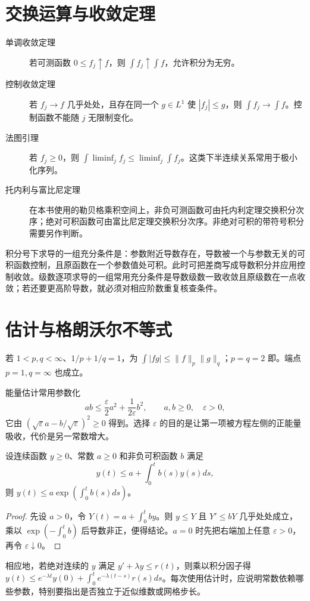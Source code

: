 \documentclass[UTF8,12pt,a4paper,fontset=fandol]{ctexbook}
\begin{document}
\section{交换运算与收敛定理}
\begin{description}
 \item[单调收敛定理] 若可测函数 $0\le f_j\uparrow f$，则 $\int f_j\uparrow\int f$，允许积分为无穷。
 \item[控制收敛定理] 若 $f_j\to f$ 几乎处处，且存在同一个 $g\in L^1$ 使 $|f_j|\le g$，则 $\int f_j\to\int f$。控制函数不能随 $j$ 无限制变化。
 \item[法图引理] 若 $f_j\ge0$，则 $\int\liminf_j f_j\le\liminf_j\int f_j$。这类下半连续关系常用于极小化序列。
 \item[托内利与富比尼定理] 在本书使用的勒贝格乘积空间上，非负可测函数可由托内利定理交换积分次序；绝对可积函数可由富比尼定理交换积分次序。非绝对可积的带符号积分需要另作判断。
\end{description}

积分号下求导的一组充分条件是：参数附近导数存在，导数被一个与参数无关的可积函数控制，且原函数在一个参数值处可积。此时可把差商写成导数积分并应用控制收敛。级数逐项求导的一组常用充分条件是导数级数一致收敛且原级数在一点收敛；若还要更高阶导数，就必须对相应阶数重复核查条件。

\section{估计与格朗沃尔不等式}
若 $1<p,q<\infty$、$1/p+1/q=1$，为 $\int|fg|\le\|f\|_p\|g\|_q$；$p=q=2$ 即。端点 $p=1,q=\infty$ 也成立。

能量估计常用参数化
\[
 ab\le\frac\varepsilon2 a^2+\frac1{2\varepsilon}b^2,\qquad a,b\ge0,\quad\varepsilon>0,
\]
它由 $(\sqrt\varepsilon a-b/\sqrt\varepsilon)^2\ge0$ 得到。选择 $\varepsilon$ 的目的是让第一项被方程左侧的正能量吸收，代价是另一常数增大。

\begin{lemma}
设连续函数 $y\ge0$、常数 $a\ge0$ 和非负可积函数 $b$ 满足
\[
 y(t)\le a+\int_0^t b(s)y(s)ds,
\]
则 $y(t)\le a\exp(\int_0^tb(s)ds)$。
\end{lemma}
\begin{proof}
先设 $a>0$，令 $Y(t)=a+\int_0^tby$。则 $y\le Y$ 且 $Y'\le bY$ 几乎处处成立，乘以 $\exp(-\int_0^tb)$ 后导数非正，便得结论。$a=0$ 时先把右端加上任意 $\varepsilon>0$，再令 $\varepsilon\downarrow0$。
\end{proof}
相应地，若绝对连续的 $y$ 满足 $y'+\lambda y\le r(t)$，则乘以积分因子得 $y(t)\le e^{-\lambda t}y(0)+\int_0^te^{-\lambda(t-s)}r(s)ds$。每次使用估计时，应说明常数依赖哪些参数，特别要指出是否独立于近似维数或网格步长。
\end{document}
